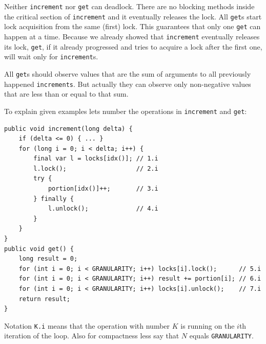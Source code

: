 \documentclass[a4paper,12pt]{article}
\begin{document}
Neither \verb|increment| nor \verb|get| can deadlock. There are no blocking methods inside the critical section of \verb|increment| and it eventually releases the lock. All \verb|get|s start lock acquisition from the same (first) lock. This guarantees that only one \verb|get| can happen at a time. Because we already showed that \verb|increment| eventually releases its lock, \verb|get|, if it already progressed and tries to acquire a lock after the first one, will wait only for \verb|increment|s.

All \verb|get|s should observe values that are the sum of arguments to all previously happened \verb|increments|. But actually they can observe only non-negative values that are less than or equal to that sum.

To explain given examples lets number the operations in \verb|increment| and \verb|get|:
\begin{verbatim}
public void increment(long delta) {
    if (delta <= 0) { ... }
    for (long i = 0; i < delta; i++) {
        final var l = locks[idx()]; // 1.i
        l.lock();                   // 2.i
        try {
            portion[idx()]++;       // 3.i
        } finally {
            l.unlock();             // 4.i
        }
    }
}
public void get() {
    long result = 0;
    for (int i = 0; i < GRANULARITY; i++) locks[i].lock();      // 5.i
    for (int i = 0; i < GRANULARITY; i++) result += portion[i]; // 6.i
    for (int i = 0; i < GRANULARITY; i++) locks[i].unlock();    // 7.i
    return result;
}
\end{verbatim}

Notation \verb|K.i| means that the operation with number $K$ is running on the $i$th iteration of the loop. Also for compactness less say that $N$ equals \verb|GRANULARITY|.
\end{document}
